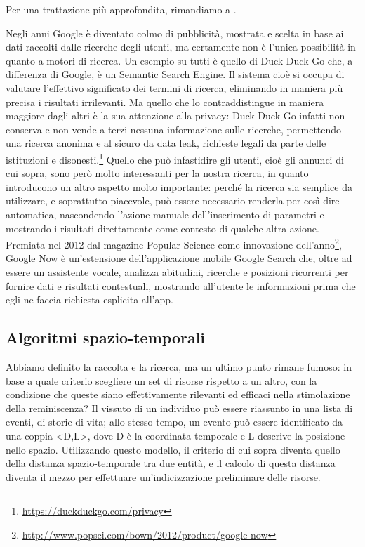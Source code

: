 \documentclass[sigproc-sp.tex]{subfiles}
\begin{document}
Per una trattazione più approfondita, rimandiamo a \cite{brin1998anatomy}.

Negli anni Google è diventato colmo di pubblicità, mostrata e scelta in base ai dati raccolti dalle ricerche degli utenti, ma certamente non è l’unica possibilità in quanto a motori di ricerca. Un esempio su tutti è quello di Duck Duck Go che, a differenza di Google, è un Semantic Search Engine. Il sistema cioè si occupa di valutare l’effettivo significato dei termini di ricerca, eliminando in maniera più precisa i risultati irrilevanti. Ma quello che lo contraddistingue in maniera maggiore dagli altri è la sua attenzione alla privacy: Duck Duck Go infatti non conserva e non vende a terzi nessuna informazione sulle ricerche, permettendo una ricerca anonima e al sicuro da data leak, richieste legali da parte delle istituzioni e disonesti.\footnote{\url{https://duckduckgo.com/privacy}}
Quello che può infastidire gli utenti, cioè gli annunci di cui sopra, sono però molto interessanti per la nostra ricerca, in quanto introducono un altro aspetto molto importante: perché la ricerca sia semplice da utilizzare, e soprattutto piacevole, può essere necessario renderla per così dire automatica, nascondendo l’azione manuale dell’inserimento di parametri e mostrando i risultati direttamente come contesto di qualche altra azione. Premiata nel 2012 dal magazine Popular Science come innovazione dell’anno\footnote{\url{http://www.popsci.com/bown/2012/product/google-now}}, Google Now è un’estensione dell’applicazione mobile Google Search che, oltre ad essere un assistente vocale, analizza abitudini, ricerche e posizioni ricorrenti per fornire dati e risultati contestuali, mostrando all’utente le informazioni prima che egli ne faccia richiesta esplicita all’app.

\subsection{Algoritmi spazio-temporali}
Abbiamo definito la raccolta e la ricerca, ma un ultimo punto rimane fumoso: in base a quale criterio scegliere un set di risorse rispetto a un altro, con la condizione che queste siano effettivamente rilevanti ed efficaci nella stimolazione della reminiscenza? Il vissuto di un individuo può essere riassunto in una lista di eventi, di storie di vita; allo stesso tempo, un evento può essere identificato da una coppia <D,L>, dove D è la coordinata temporale e L descrive la posizione nello spazio. Utilizzando questo modello, il criterio di cui sopra diventa quello della distanza spazio-temporale tra due entità, e il calcolo di questa distanza diventa il mezzo per effettuare un’indicizzazione preliminare delle risorse.
\end{document}

